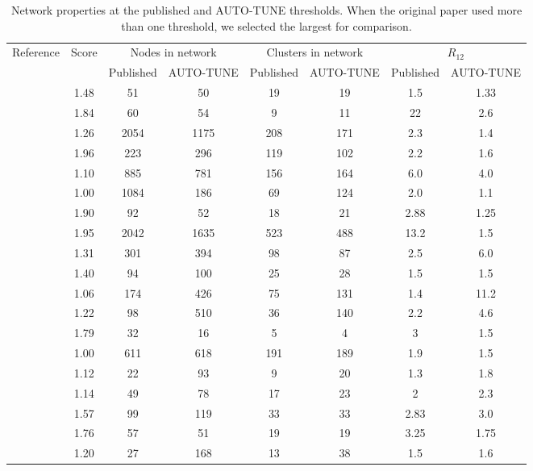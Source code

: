 \documentclass[utf8]{FrontiersinHarvard} %
\begin{document}
\begin{table}[h]
	\caption{Network properties at the published and AUTO-TUNE thresholds. When the original paper used more than one threshold, we selected the largest for comparison.}
	\vspace{10pt}
	\centering
	\begin{ssmall}
	\label{tab:paperComparisonProp}
	\begin{tabular}{cccccccc}
	   \hline
		Reference  & Score & \multicolumn{2}{c}{Nodes in network} &  \multicolumn{2}{c}{Clusters in network} & \multicolumn{2}{c}{$R_{12}$} \\
		& & Published & AUTO-TUNE & Published & AUTO-TUNE  & Published & AUTO-TUNE \\
	 \hline
		\citet{sivay_hiv-1_2018} & 1.48 & 51 & 50 & 19 & 19 & 1.5 & 1.33 \\
		\citet{dalai_combining_2018} & 1.84 & 60 & 54 & 9 & 11 & 22 & 2.6 \\
		\cite{h_acquisition_2021}  & 1.26 & 2054 & 1175 &  208 & 171 & 2.3 & 1.4 \\
		\cite{bbosa_short_2020}  & 1.96 & 223 & 296 &  119 & 102 & 2.2 & 1.6 \\
		\cite{liu_dynamics_2020}  & 1.10 & 885 & 781 &  156 & 164 & 6.0 & 4.0 \\
		\cite{h_acquisition_2021}  & 1.00 & 1084 & 186 &  69 & 124 & 2.0 & 1.1 \\
		\cite{brenner_role_2021}  & 1.90 & 92 & 52 & 18 & 21 & 2.88 & 1.25 \\
		\cite{rhee_national_2019}  & 1.95 & 2042 & 1635 & 523 & 488 & 13.2 & 1.5 \\
		\cite{Little:2014aa}  & 1.31 & 301 & 394 & 98 & 87 & 2.5& 6.0 \\
		\cite{Zai:2020aa}  & 1.40 & 94 & 100 & 25 & 28 & 1.5 & 1.5 \\
		\cite{Gibson:2019aa} & 1.06 & 174 & 426 & 75 & 131 & 1.4 & 11.2 \\
		\cite{Stecher:2018aa} & 1.22 & 98 & 510 & 36 & 140 & 2.2 & 4.6 \\
		\cite{Temereanca:2017aa} & 1.79 & 32 & 16 & 5 & 4 & 3 & 1.5 \\
		\cite{Fabeni:2020aa}  & 1.00 & 611 & 618 & 191 & 189 & 1.9 & 1.5\\
		\cite{Chen:2023aa} & 1.12 & 22 & 93 & 9 & 20 & 1.3 & 1.8 \\
		\cite{Billings:2019aa} & 1.14 & 49 & 78 & 17 & 23 & 2 & 2.3 \\
		\cite{Li:2022aa} &  1.57 & 99 & 119 & 33 & 33 & 2.83 & 3.0\\
		\cite{Yu:2022aa} &  1.76 & 57 &  51 & 19 & 19 & 3.25 &1.75\\
		\cite{Leal:2020aa}  & 1.20 & 27 & 168 & 13 & 38 & 1.5 & 1.6\\

	\hline
	\end{tabular}
	\end{ssmall}
\end{table}
\end{document}
